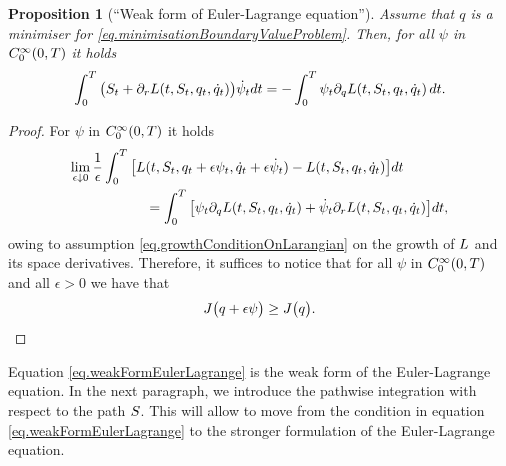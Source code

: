 \documentclass[10pt,a4paper]{article}
\newtheorem{prop}[thm]{Proposition}
\begin{document}
\begin{appendices}
\begin{prop}[``Weak form of Euler-Lagrange equation'']
	Assume that $q$ is a minimiser for \eqref{eq.minimisationBoundaryValueProblem}. Then, for all $\psi$ in $C^{\infty}_{0}(0,T)$ it holds 
	\begin{equation}
	\label{eq.weakFormEulerLagrange}
	\int_{0}^{T} \big( S_t + \partial_r L (t,S_t,q_t,\dot{q}_t) \big ) \dot{\psi}_t dt 
	= 
	- \int_{0}^{T} \psi_t \partial_q L (t,S_t,q_t,\dot{q}_t) \, dt .
	\end{equation}
\end{prop}
\begin{proof}
	For $\psi$ in $C^{\infty}_{0}(0,T)$ it holds 
	\begin{equation*}
	\begin{split}
	\lim_{\epsilon \downarrow 0} \frac{1}{\epsilon }\int_{0}^{T} \big[
		L &(t, S_t, q_t + \epsilon \psi_t, \dot{q}_t + \epsilon \dot{\psi}_t ) -  L (t,S_t,q_t, \dot{q}_t  )
	\big] dt \\
	& = \int_{0}^{T} \big[
		\psi_t \partial_q  L (t,S_t,q_t, \dot{q}_t  ) + \dot{\psi}_t \partial_r  L (t,S_t,q_t, \dot{q}_t  )
	\big] dt, 
	\end{split}
	\end{equation*}
	owing to assumption \eqref{eq.growthConditionOnLarangian} on the growth of $L$ and its space derivatives. Therefore, it suffices to notice that for all $\psi$ in $C^{\infty}_{0}(0,T)$ and all $\epsilon>0$ we have that 
	\begin{equation*}
	J \big( q+\epsilon\psi \big) \geq J \big( q\big).
	\end{equation*}
\end{proof}

Equation \eqref{eq.weakFormEulerLagrange} is the weak form of the Euler-Lagrange equation. In the next  paragraph, we introduce the pathwise integration with respect to the path $S$. This will allow to move from the condition in equation \eqref{eq.weakFormEulerLagrange} to the stronger formulation of the Euler-Lagrange equation. 


\end{appendices}
\end{document}

